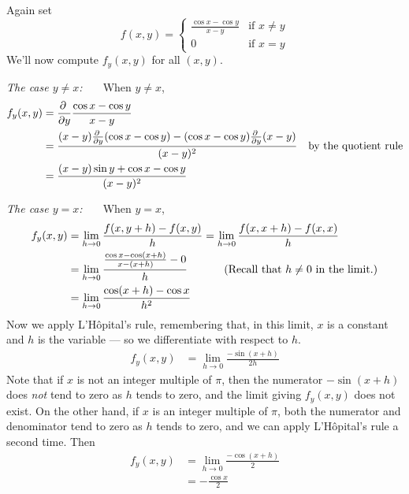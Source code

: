 \begin{eg}\label{eg partials DD}
Again set
\begin{equation*}
f(x,y)=\begin{cases}
             \frac{\cos x-\cos y}{x-y}&\text{if $x\ne y$}\\ 
                    0&\text{if $x=y$}
        \end{cases}
\end{equation*}
We'll now compute $f_y(x,y)$ for all $(x,y)$.

\medskip
\noindent
\emph{The case $y\ne x$:\ \ \ }
When $y\ne x$,
\begin{align*}
f_y(x,y) & = \pdiff{}{y}\frac{\cos x-\cos y}{x-y} \\
         &=\frac{(x-y)\pdiff{}{y}(\cos x-\cos y)
                  - (\cos x-\cos y)\pdiff{}{y}(x-y) }{(x-y)^2} 
       \quad\text{by the quotient rule} \\
         &=\frac{(x-y)\sin y
                  + \cos x-\cos y }{(x-y)^2} 
\end{align*}

\medskip
\noindent
\emph{The case $y= x$:\ \ \ }
When $y = x$,
\begin{align*}
f_y(x,y) &= \lim_{h\rightarrow 0}\frac{f(x,y+h)-f(x,y)}{h}
          = \lim_{h\rightarrow 0}\frac{f(x,x+h)-f(x,x)}{h}
          \hidewidth \\
         &= \lim_{h\rightarrow 0}\frac{\frac{\cos x-\cos(x+h)}{x-(x+h)}-0}{h}
         &\qquad\text{(Recall that $h\ne 0$ in the limit.)} \\
         &= \lim_{h\rightarrow 0}\frac{\cos(x+h)-\cos x}{h^2} 
\end{align*}
Now we apply L'H\^opital's rule, remembering that, in this limit,
$x$ is a constant and $h$ is the variable --- so we differentiate with respect to $h$.
\begin{align*}
f_y(x,y)  &= \lim_{h\rightarrow 0}\frac{-\sin(x+h)}{2h}
\end{align*}
Note that if $x$ is not an integer multiple of $\pi$, then the numerator
$-\sin(x+h)$ does \emph{not} tend to zero as $h$ tends to zero, and the limit
giving $f_y(x,y)$ does not exist. On the other hand, if $x$ is an integer multiple of $\pi$,
both the numerator and denominator tend to zero as $h$ tends to zero, and we can
apply  L'H\^opital's rule a second time. Then
\begin{align*}
f_y(x,y)  &= \lim_{h\rightarrow 0}\frac{-\cos(x+h)}{2}  \\
         &=-\frac{\cos x}{2}
\end{align*}


\end{eg}
